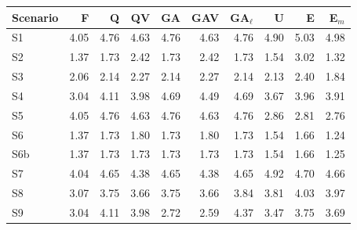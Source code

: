 \begin{tabular}{@{}lrrrrrrrrr@{}}
\toprule
Scenario & F & Q & QV & GA & GAV & GA$_\ell$ & U & E & E$_m$ \\
\midrule
S1 & 4.05 & 4.76 & 4.63 & 4.76 & 4.63 & 4.76 & 4.90 & 5.03 & 4.98 \\
S2 & 1.37 & 1.73 & 2.42 & 1.73 & 2.42 & 1.73 & 1.54 & 3.02 & 1.32 \\
S3 & 2.06 & 2.14 & 2.27 & 2.14 & 2.27 & 2.14 & 2.13 & 2.40 & 1.84 \\
S4 & 3.04 & 4.11 & 3.98 & 4.69 & 4.49 & 4.69 & 3.67 & 3.96 & 3.91 \\
S5 & 4.05 & 4.76 & 4.63 & 4.76 & 4.63 & 4.76 & 2.86 & 2.81 & 2.76 \\
S6 & 1.37 & 1.73 & 1.80 & 1.73 & 1.80 & 1.73 & 1.54 & 1.66 & 1.24 \\
S6b & 1.37 & 1.73 & 1.73 & 1.73 & 1.73 & 1.73 & 1.54 & 1.66 & 1.25 \\
S7 & 4.04 & 4.65 & 4.38 & 4.65 & 4.38 & 4.65 & 4.92 & 4.70 & 4.66 \\
S8 & 3.07 & 3.75 & 3.66 & 3.75 & 3.66 & 3.84 & 3.81 & 4.03 & 3.97 \\
S9 & 3.04 & 4.11 & 3.98 & 2.72 & 2.59 & 4.37 & 3.47 & 3.75 & 3.69 \\
\bottomrule
\end{tabular}